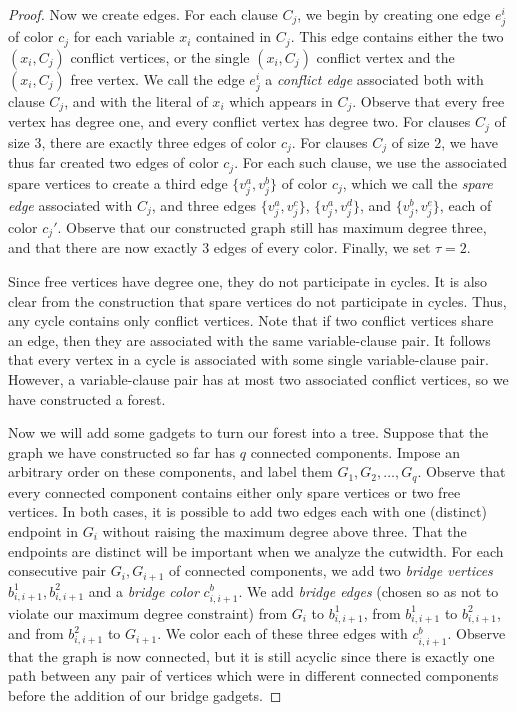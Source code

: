 \begin{proof}
    Now we create edges.
    For each clause $C_j$, we begin by creating one edge $e_j^i$ of color $c_j$ for each variable $x_i$ contained in $C_j$. This edge contains either the two $(x_i, C_j)$ conflict vertices, or the single $(x_i, C_j)$ conflict vertex and the $(x_i, C_j)$ free vertex.
    We call the edge $e_j^i$ a \emph{conflict edge} associated both with clause $C_j$, and with the literal of $x_i$ which appears in $C_j$.
    Observe that every free vertex has degree one, and every conflict vertex has degree two.
    For clauses $C_j$ of size $3$, there are exactly three edges of color $c_j$.
    For clauses $C_j$ of size $2$, we have thus far created two edges of color $c_j$.
    For each such clause, we use the associated spare vertices to create a third edge $\{v_j^a, v_j^b\}$ of color $c_j$, which we call the \emph{spare edge} associated with $C_j$, and three edges $\{v_j^a, v_j^c\}$, $\{v_j^a, v_j^d\}$, and $\{v_j^b, v_j^e\}$, each of color $c_j'$.
    Observe that our constructed graph still has maximum degree three, and that there are now exactly $3$ edges of every color.
    Finally, we set $\tau = 2$.

    Since free vertices have degree one, they do not participate in cycles.
    It is also clear from the construction that spare vertices do not participate in cycles.
    Thus, any cycle contains only conflict vertices.
    Note that if two conflict vertices share an edge, then they are associated with the same variable-clause pair.
    It follows that every vertex in a cycle is associated with some single variable-clause pair.
    However, a variable-clause pair has at most two associated conflict vertices, so we have constructed a forest.

    Now we will add some gadgets to turn our forest into a tree. Suppose that the graph we have constructed so far has $q$ connected components.
    Impose an arbitrary order on these components, and label them $G_1, G_2, \ldots, G_q$.
    Observe that every connected component contains either only spare vertices or two free vertices.
    In both cases, it is possible to add two edges each with one (distinct) endpoint in $G_i$ without raising the maximum degree above three.
    That the endpoints are distinct will be important when we analyze the cutwidth.
    For each consecutive pair $G_i, G_{i+1}$ of connected components, we add two \emph{bridge vertices} $b_{i, i+1}^1, b_{i, i+1}^2$ and a \emph{bridge color} $c_{i, i+1}^b$.
    We add \emph{bridge edges} (chosen so as not to violate our maximum degree constraint) from $G_i$ to $b_{i,i+1}^1$, from $b_{i, i+1}^1$ to $b_{i, i+1}^2$, and from $b_{i, i+1}^2$ to $G_{i+1}$.
    We color each of these three edges with $c_{i, i+1}^b$. Observe that the graph is now connected, but it is still acyclic since there is exactly
    one path between any pair of vertices which were in different connected components before the addition of our bridge gadgets.


\end{proof}
